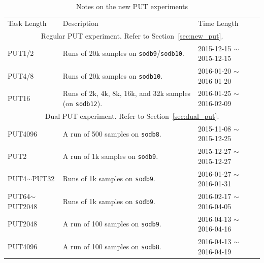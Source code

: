 \documentclass[10pt]{article}
\begin{document}
\begin{table}[H]
\begin{center}
\begin{tabular}{|p{3cm}||p{9cm}|p{4cm}|} \hline
Task Length & Description & Time Length\\ \cline{1-3}
\multicolumn{3}{|c|}{Regular PUT experiment. Refer to Section~\ref{sec:new_put}.} \\ \hline
PUT1/2 & Runs of 20k samples on {\tt sodb9}/{\tt sodb10}. & 2015-12-15 $\sim$ 2015-12-15 \\ \hline
PUT4/8 & Runs of 20k samples on {\tt sodb10}. & 2016-01-20 $\sim$ 2016-01-20  \\ \hline 
PUT16 & Runs of 2k, 4k, 8k, 16k, and 32k samples (on {\tt sodb12}). & 2016-01-25 $\sim$ 2016-02-09\\ \cline{1-3}
\multicolumn{3}{|c|}{Dual PUT experiment. Refer to Section~\ref{sec:dual_put}.} \\ \hline
PUT4096 & A run of 500 samples on {\tt sodb8}. %
& 2015-11-08 $\sim$ 2015-12-25 \\ \hline 
PUT2 & A run of 1k samples on {\tt sodb9}. & 2015-12-27 $\sim$ 2015-12-27 \\ \hline
PUT4$\sim$PUT32 & Runs of 1k samples on {\tt sodb9}. & 2016-01-27 $\sim$ 2016-01-31 \\ \hline
PUT64$\sim$PUT2048& Runs of 1k samples on {\tt sodb9}. & 2016-02-17 $\sim$ 2016-04-05 \\ \hline
PUT2048 & A run of 100 samples on {\tt sodb9}. & 2016-04-13 $\sim$ 2016-04-16 \\ \hline
PUT4096 & A run of 100 samples on {\tt sodb8}. & 2016-04-13 $\sim$ 2016-04-19 \\ \hline
\end{tabular}
\end{center}
\vspace{-.2in}
\caption{Notes on the new PUT experiments\label{tab:exp_notes3}}
\end{table}
\end{document}

